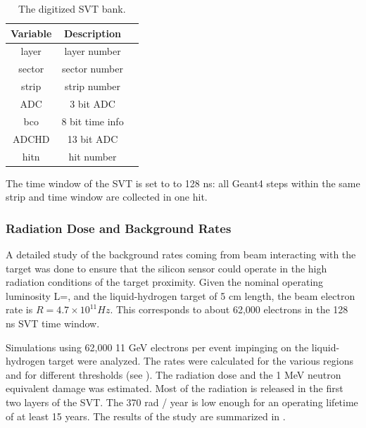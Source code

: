 \begin{table}[h]
	\begin{center}
		\begin{tabular}{| c | c | c |}
			\hline \hline
			Variable  & Description   \\
			\hline
               layer  &        layer number    \\
              sector  &       sector number    \\
               strip  &        strip number    \\
                 ADC  &           3 bit ADC    \\
                 bco  &     8 bit time info    \\
               ADCHD  &          13 bit ADC    \\
                hitn  &          hit number    \\
			\hline \hline
		\end{tabular}
	\end{center}
	\caption{The digitized SVT bank.}\label{tab:bstBank}
\end{table}

The time window  of the SVT is set to to 128 ns: all Geant4 steps within the same strip and time window are collected in one hit.

\subsubsection{Radiation Dose and Background Rates}
A detailed study of the background rates coming from beam interacting with the target was done to ensure that the silicon sensor
could operate in the high radiation conditions of the target proximity.
Given the nominal operating luminosity L=\cLuminosity, and the liquid-hydrogen target of 5 cm length, the beam electron rate
is $R=4.7 \times 10^{11} Hz$. This corresponds to about 62,000 electrons in the 128 ns SVT time window.

Simulations using 62,000 11 GeV electrons per event impinging on the liquid-hydrogen target were analyzed.
The rates were calculated for the various regions and for different thresholds (see ).
The radiation dose and the 1 MeV neutron equivalent damage was estimated. Most of the radiation
is released in the first two layers of the SVT.
The 370 rad / year is low enough for an operating lifetime of at least 15 years. The results of the study
are summarized in .


